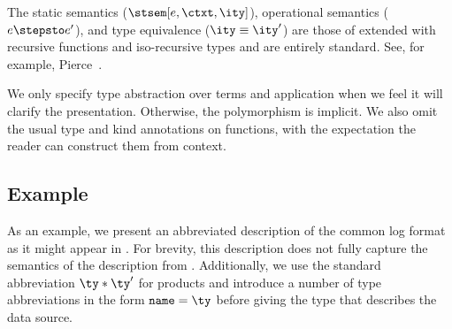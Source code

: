 The static semantics ($\stsem[e,\ctxt,\ity]$), operational
semantics ($e \stepsto e'$), and type 
equivalence ($\ity \equiv \ity'$) are those of \fomega{} extended with
recursive functions and iso-recursive types and are entirely standard.
See, for example, Pierce~\cite{pierce:tapl}.

We only specify type
abstraction over terms and application when we feel it will clarify
the presentation. Otherwise, the polymorphism is implicit.  We also
omit the usual type and kind annotations on functions, with the
expectation the reader can construct them from context.  

\subsection{Example}
\label{sec:ddc-example}

As an example, we present an abbreviated description of the common log
format as it might appear in \ddc{}. For brevity,
this description does not fully capture the semantics of the
\ipads{} description from . Additionally, we
use the standard abbreviation $\ty * \ty'$ for products and introduce a number of type abbreviations
in the form $\mathtt{name} = \ty$ before giving the type that describes the data source.

